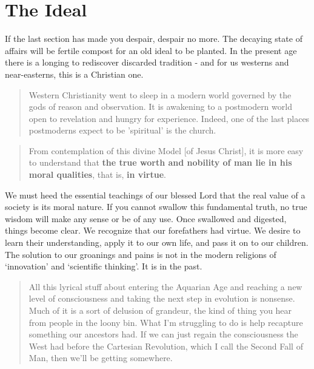 \documentclass[letterpaper]{article}
\begin{document}
\section{The Ideal}

If the last section has made you despair, despair no more. The decaying state of affairs will be fertile compost for an old ideal to be planted. In the present age there is a longing to rediscover discarded tradition - and for us westerns and near-easterns, this is a Christian one.

\begin{quote}
  Western Christianity went to sleep in a modern world governed by the gods of reason and observation. It is awakening to a postmodern world open to revelation and hungry for experience. Indeed, one of the last places postmoderns expect to be 'spiritual' is the church.
\end{quote}


\begin{quote}
  From contemplation of this divine Model [of Jesus Christ], it is more easy to understand that \textbf{the true worth and nobility of man lie in his moral qualities}, that is, \textbf{in virtue}.
\end{quote}

We must heed the essential teachings of our blessed Lord that the real value of a society is its moral nature. If you cannot swallow this fundamental truth, no true wisdom will make any sense or be of any use. Once swallowed and digested, things become clear. We recognize that our forefathers had virtue. We desire to learn their understanding, apply it to our own life, and pass it on to our children. The solution to our groanings and pains is not in the modern religions of `innovation' and `scientific thinking'. It is in the past.

\begin{quote}
  All this lyrical stuff about entering the Aquarian Age and reaching a new level of consciousness and taking the next step in evolution is nonsense. Much of it is a sort of delusion of grandeur, the kind of thing you hear from people in the loony bin. What I'm struggling to do is help recapture something our ancestors had. If we can just regain the consciousness the West had before the Cartesian Revolution, which I call the Second Fall of Man, then we'll be getting somewhere.

\end{quote}
\end{document}
